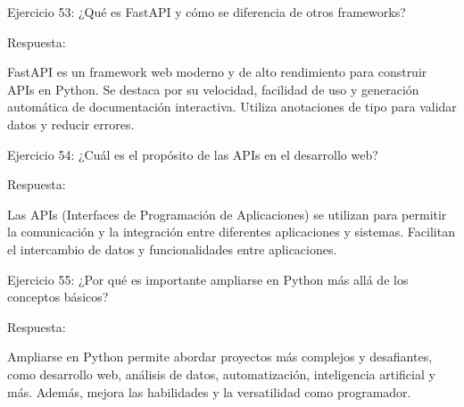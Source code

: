 \documentclass[
  a4paper,
  DIV=11,
  numbers=noendperiod,
  onepage,
  openany]{scrreprt}
\begin{document}
Ejercicio 53: ¿Qué es FastAPI y cómo se diferencia de otros frameworks?

Respuesta:

FastAPI es un framework web moderno y de alto rendimiento para construir
APIs en Python. Se destaca por su velocidad, facilidad de uso y
generación automática de documentación interactiva. Utiliza anotaciones
de tipo para validar datos y reducir errores.

Ejercicio 54: ¿Cuál es el propósito de las APIs en el desarrollo web?

Respuesta:

Las APIs (Interfaces de Programación de Aplicaciones) se utilizan para
permitir la comunicación y la integración entre diferentes aplicaciones
y sistemas. Facilitan el intercambio de datos y funcionalidades entre
aplicaciones.

Ejercicio 55: ¿Por qué es importante ampliarse en Python más allá de los
conceptos básicos?

Respuesta:

Ampliarse en Python permite abordar proyectos más complejos y
desafiantes, como desarrollo web, análisis de datos, automatización,
inteligencia artificial y más. Además, mejora las habilidades y la
versatilidad como programador.
\end{document}
